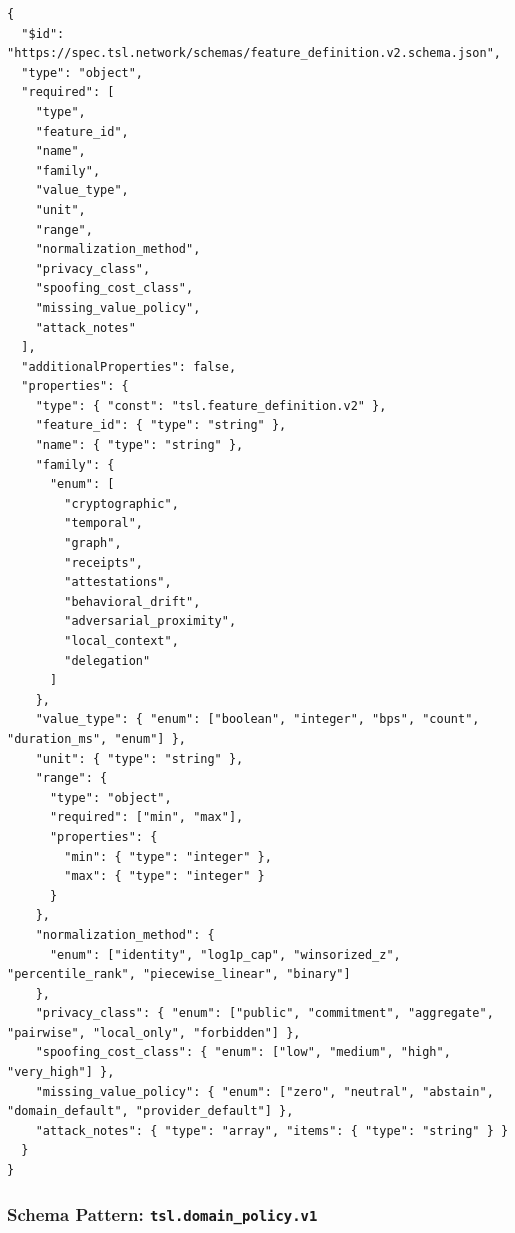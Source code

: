 \documentclass[11pt]{article}
\begin{document}
\begin{lstlisting}[style=tslcode]
{
  "$id": "https://spec.tsl.network/schemas/feature_definition.v2.schema.json",
  "type": "object",
  "required": [
    "type",
    "feature_id",
    "name",
    "family",
    "value_type",
    "unit",
    "range",
    "normalization_method",
    "privacy_class",
    "spoofing_cost_class",
    "missing_value_policy",
    "attack_notes"
  ],
  "additionalProperties": false,
  "properties": {
    "type": { "const": "tsl.feature_definition.v2" },
    "feature_id": { "type": "string" },
    "name": { "type": "string" },
    "family": {
      "enum": [
        "cryptographic",
        "temporal",
        "graph",
        "receipts",
        "attestations",
        "behavioral_drift",
        "adversarial_proximity",
        "local_context",
        "delegation"
      ]
    },
    "value_type": { "enum": ["boolean", "integer", "bps", "count", "duration_ms", "enum"] },
    "unit": { "type": "string" },
    "range": {
      "type": "object",
      "required": ["min", "max"],
      "properties": {
        "min": { "type": "integer" },
        "max": { "type": "integer" }
      }
    },
    "normalization_method": {
      "enum": ["identity", "log1p_cap", "winsorized_z", "percentile_rank", "piecewise_linear", "binary"]
    },
    "privacy_class": { "enum": ["public", "commitment", "aggregate", "pairwise", "local_only", "forbidden"] },
    "spoofing_cost_class": { "enum": ["low", "medium", "high", "very_high"] },
    "missing_value_policy": { "enum": ["zero", "neutral", "abstain", "domain_default", "provider_default"] },
    "attack_notes": { "type": "array", "items": { "type": "string" } }
  }
}
\end{lstlisting}

\subsubsection{Schema Pattern: \texttt{tsl.domain\_policy.v1}}
\end{document}
